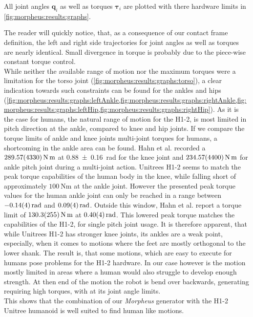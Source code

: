 All joint angles $\bm q_i$ as well as torques $\bm \tau_i$ are plotted with there hardware limits in \cref{fig:morpheus:results:graphs}.
\par
The reader will quickly notice, that, as a consequence of our contact frame definition, the left and right side trajectories for joint angles as well as torques are nearly identical.
Small divergence in torque is probably due to the piece-wise constant torque control.
\\
While neither the available range of motion nor the maximum torques were a limitation for the torso joint (\cref{fig:morpheus:results:graphs:torso}), a clear indication towards such constraints can be found for the ankles and hips (\cref{fig:morpheus:results:graphs:leftAnkle,fig:morpheus:results:graphs:rightAnkle,fig:morpheus:results:graphs:leftHip,fig:morpheus:results:graphs:rightHip}).
As it is the case for humans, the natural range of motion for the H1-2, is most limited in pitch direction at the ankle, compared to knee and hip joints.
If we compare the torque limits of ankle and knee joints multi-joint torques for humans, a shortcoming in the ankle area can be found.
Hahn et al. \cite{hahn_2011} recorded a $\SI{289.57 \pm 43.3}{\N \m}$ at \SI{0.88 \pm 0.16}{\radian} for the knee joint and $\SI{234.57 \pm 44.0}{\N \m}$ for ankle pitch joint during a multi-joint action.
Unitrees H1-2 seems to match the peak torque capabilities of the human body in the knee, while falling short of approximately $\SI{100}{\N \m}$ at the ankle joint.
However the presented peak torque values for the human ankle joint can only be reached in a range between $\SI{-0.14 \pm 0.04}{\radian}$ and $\SI{0.09 \pm 0.04}{\radian}$.
Outside this window, Hahn et al. report a torque limit of $\SI{130.3 \pm 25.5}{\N \m}$ at $\SI{0.40 \pm 0.04}{\radian}$.
This lowered peak torque matches the capabilities of the H1-2, for single pitch joint usage.
It is therefore apparent, that while Unitrees H1-2 has stronger knee joints, its ankles are a weak point, especially, when it comes to motions where the feet are mostly orthogonal to the lower shank.
The result is, that some motions, which are easy to execute for humans pose problems for the H1-2 hardware.
In our case however is the motion mostly limited in areas where a human would also struggle to develop enough strength.
At then end of the motion the robot is bend over backwards, generating requiring high torques, with at its joint angle limits.
\\
This shows that the combination of our \textit{Morpheus} generator with the H1-2 Unitree humanoid is well suited to find human like motions.
